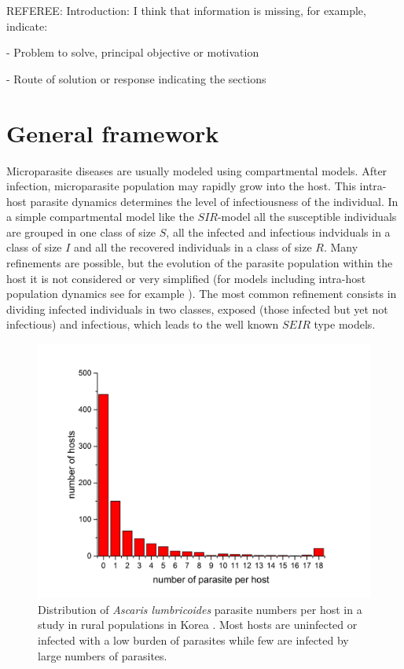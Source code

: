 \documentclass[eng]{MMSB-class-eng}
\begin{document}
{\color{blue} REFEREE: Introduction: I think that information is missing, for example, indicate:
	
	
	- Problem to solve, principal objective or motivation
	
	
	- Route of solution or response indicating the sections }

\section{General framework}

Microparasite diseases are usually modeled using compartmental models. After infection,  microparasite population may rapidly grow into the host. This intra-host parasite dynamics determines the level of infectiousness of the individual. In a simple compartmental  model like the $SIR$-model  all the susceptible individuals are grouped in one class of size $S$, all the infected and infectious indviduals in a class of size $I$ and all the recovered individuals in a class of size $R$. Many refinements are possible, but the evolution of the parasite population within the host it is not considered or very simplified (for models including intra-host population dynamics 
see for example \citet{gandolfi2015epidemic}).
The most common refinement consists in dividing infected individuals in two classes, exposed (those infected but yet not infectious) and infectious, which leads to the well known $SEIR$ type models. 

\begin{figure}[!tb]
	\centering
	\includegraphics[width=0.99\linewidth]{dataseo}
	\caption{Distribution of \textit{Ascaris lumbricoides} parasite numbers per host in a study in rural populations in Korea \citep{seo1979frequency}. Most hosts are uninfected or infected with a low burden of parasites while few are infected by large numbers of parasites.}
	\label{fig:dataseo}
\end{figure}
\end{document}

